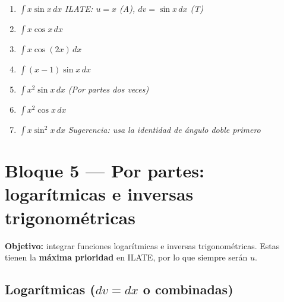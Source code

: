 \documentclass[12pt, letterpaper]{article}
\newcommand{\dx}{\,dx}
\begin{document}
\begin{enumerate}[label=\textbf{\arabic*.}, leftmargin=*, itemsep=12pt, start=54]

  \item \facil\quad
    $\displaystyle\int x\sin x\dx$
    \qquad\textit{ILATE: $u = x$ (A), $dv = \sin x\dx$ (T)}

  \item \facil\quad
    $\displaystyle\int x\cos x\dx$

  \item \medio\quad
    $\displaystyle\int x\cos(2x)\dx$

  \item \medio\quad
    $\displaystyle\int (x-1)\sin x\dx$

  \item \medio\quad
    $\displaystyle\int x^2\sin x\dx$
    \qquad\textit{(Por partes dos veces)}

  \item \dificil\quad
    $\displaystyle\int x^2\cos x\dx$

  \item \dificil\quad
    $\displaystyle\int x\sin^2 x\dx$
    \qquad\textit{Sugerencia: usa la identidad de ángulo doble primero}

\end{enumerate}

\vspace{4pt}

\section{Bloque 5 — Por partes: logarítmicas e inversas trigonométricas}

\begin{cuadroinfo}
\small\textbf{Objetivo:} integrar funciones logarítmicas e inversas trigonométricas.
Estas tienen la \textbf{máxima prioridad} en ILATE, por lo que siempre serán $u$.
\end{cuadroinfo}

\vspace{4pt}

\subsection{Logarítmicas ($dv = dx$ o combinadas)}
\end{document}
